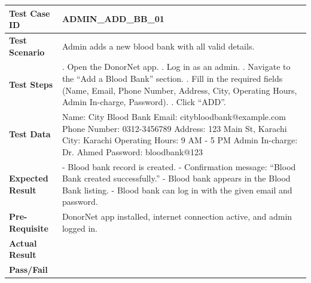 \documentclass[11pt]{article}
\begin{document}
\noindent
\begin{tabularx}{\textwidth}{|>{\raggedright\arraybackslash}p{}|>{\raggedright\arraybackslash}X|}
\hline
\textbf{Test Case ID} & ADMIN\_ADD\_BB\_01 \\
\hline
\textbf{Test Scenario} & Admin adds a new blood bank with all valid details. \\
\hline
\textbf{Test Steps} & 1. Open the DonorNet app. \newline
2. Log in as an admin. \newline
3. Navigate to the ``Add a Blood Bank'' section. \newline
4. Fill in the required fields (Name, Email, Phone Number, Address, City, Operating Hours, Admin In-charge, Password). \newline
5. Click ``ADD''. \\
\hline
\textbf{Test Data} & Name: City Blood Bank \newline
Email: citybloodbank@example.com \newline
Phone Number: 0312-3456789 \newline
Address: 123 Main St, Karachi \newline
City: Karachi \newline
Operating Hours: 9 AM - 5 PM \newline
Admin In-charge: Dr. Ahmed \newline
Password: bloodbank@123 \\
\hline
\textbf{Expected Result} & - Blood bank record is created. \newline
- Confirmation message: ``Blood Bank created successfully.'' \newline
- Blood bank appears in the Blood Bank listing. \newline
- Blood bank can log in with the given email and password. \\
\hline
\textbf{Pre-Requisite} & DonorNet app installed, internet connection active, and admin logged in. \\
\hline
\textbf{Actual Result} &  \\
\hline
\textbf{Pass/Fail} &  \\
\hline
\end{tabularx}
\vspace{1em}
\end{document}
